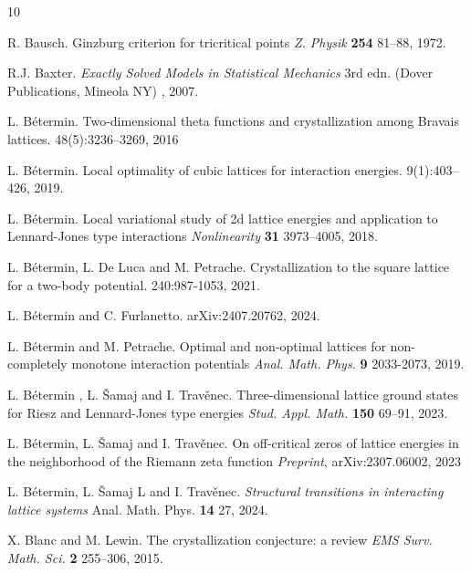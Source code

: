 \documentclass[12pt]{iopart}
\theoremstyle{definition}
\begin{document}
\begin{thebibliography}{10}

 R. Bausch.
Ginzburg criterion for tricritical points
{\it Z. Physik} {\bf 254} 81--88, 1972.

 R.J. Baxter.
{\it Exactly Solved Models in Statistical Mechanics}
3rd edn. (Dover Publications, Mineola NY) , 2007.  

L. B\'etermin. 
\newblock Two-dimensional theta functions and crystallization among Bravais lattices. 
 48(5):3236–3269, 2016

L. B\'etermin.
\newblock Local optimality of cubic lattices for interaction energies.
 9(1):403–426, 2019.

 L. B\'etermin.
Local variational study of 2d lattice energies and application
to Lennard-Jones type interactions
{\it Nonlinearity} {\bf 31} 3973--4005, 2018.

L. B\'etermin, L. De Luca and M. Petrache.
\newblock Crystallization to the square lattice for a two-body potential.
 240:987-1053, 2021.

L. B\'etermin and C. Furlanetto.
 arXiv:2407.20762, 2024.

 L. B\'etermin and M. Petrache.
Optimal and non-optimal lattices for non-completely monotone interaction
potentials
{\it Anal. Math. Phys.} {\bf 9} 2033-2073, 2019.

  L. B\'etermin , L. \v{S}amaj  and I. Trav\v{e}nec.
Three-dimensional lattice ground states for Riesz and Lennard-Jones
type energies
{\it Stud. Appl. Math.} {\bf 150} 69--91, 2023.

 L. B\'etermin, L. \v{S}amaj and I. Trav\v{e}nec.
On off-critical zeros of lattice energies in the neighborhood of the Riemann
zeta function  
{\it Preprint}, arXiv:2307.06002, 2023

 L. B\'etermin, L. \v{S}amaj L and I. Trav\v{e}nec.
{\it Structural transitions in interacting lattice systems}
Anal. Math. Phys. {\bf 14} 27, 2024.

 X. Blanc and M. Lewin.
The crystallization conjecture: a review
{\it EMS Surv. Math. Sci.} {\bf 2} 255--306, 2015.


\end{thebibliography}
\end{document}
